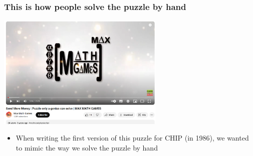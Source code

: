 \begin{frame}
\frametitle{This is how people solve the puzzle by hand}
\label{sendmore:not an expert}
\href{https://www.youtube.com/watch?v=zLUCWsEeEg8}{\includegraphics[width=8cm]{../sendmore/maxmathgames}}

\begin{itemize}
\item When writing the first version of this puzzle for CHIP (in 1986), we wanted to mimic the way we solve the puzzle by hand
\end{itemize}

\end{frame}




